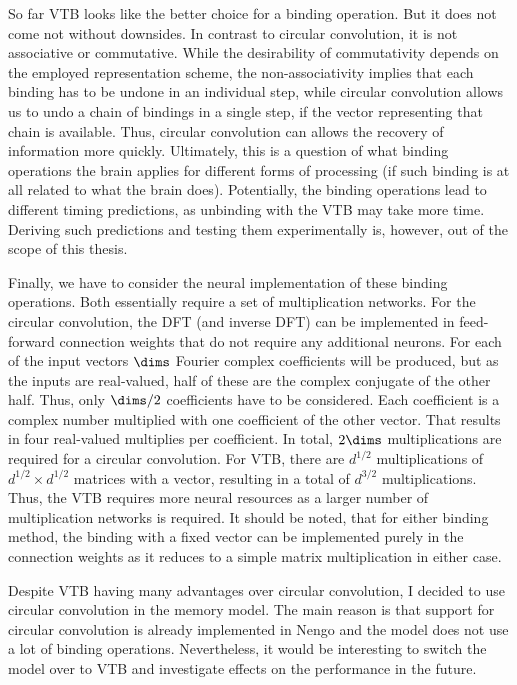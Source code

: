 So far VTB looks like the better choice for a binding operation.
But it does not come not without downsides.
In contrast to circular convolution, it is not associative or commutative.
While the desirability of commutativity depends on the employed representation scheme, the non-associativity implies that each binding has to be undone in an individual step, while circular convolution allows us to undo a chain of bindings in a single step, if the vector representing that chain is available.
Thus, circular convolution can allows the recovery of information more quickly.
Ultimately, this is a question of what binding operations the brain applies for different forms of processing (if such binding is at all related to what the brain does).
Potentially, the binding operations lead to different timing predictions, as unbinding with the VTB may take more time.
Deriving such predictions and testing them experimentally is, however, out of the scope of this thesis.

Finally, we have to consider the neural implementation of these binding operations.
Both essentially require a set of multiplication networks.
For the circular convolution, the DFT (and inverse DFT) can be implemented in feed-forward connection weights that do not require any additional neurons.
For each of the input vectors $\dims$ Fourier complex coefficients will be produced, but as the inputs are real-valued, half of these are the complex conjugate of the other half.
Thus, only $\dims / 2$ coefficients have to be considered.
Each coefficient is a complex number multiplied with one coefficient of the other vector.
That results in four real-valued multiplies per coefficient.
In total, $2\dims$ multiplications are required for a circular convolution.
For VTB, there are $d^{1/2}$ multiplications of $d^{1/2} \times d^{1/2}$ matrices with a vector, resulting in a total of $d^{3/2}$ multiplications.
Thus, the VTB requires more neural resources as a larger number of multiplication networks is required.
It should be noted, that for either binding method, the binding with a fixed vector can be implemented purely in the connection weights as it reduces to a simple matrix multiplication in either case.

Despite VTB having many advantages over circular convolution, I decided to use circular convolution in the memory model.
The main reason is that support for circular convolution is already implemented in Nengo and the model does not use a lot of binding operations.
Nevertheless, it would be interesting to switch the model over to VTB and investigate effects on the performance in the future.


